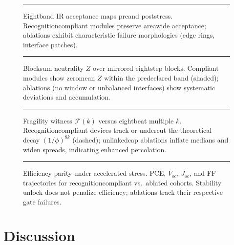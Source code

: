 \documentclass[12pt]{article}
\begin{document}
\begin{figure}[t]
  \centering
  \rule{0.82\linewidth}{0.36\linewidth}
  \caption{Eight\textendash band IR acceptance maps pre\textendash and post\textendash stress. Recognition\textendash compliant modules preserve area\textendash wide acceptance; ablations exhibit characteristic failure morphologies (edge rings, interface patches).}
  \label{fig:acceptance}
\end{figure}

\begin{figure}[t]
  \centering
  \rule{0.82\linewidth}{0.36\linewidth}
  \caption{Block\textendash sum neutrality $Z$ over mirrored eight\textendash step blocks. Compliant modules show zero\textendash mean $Z$ within the predeclared band (shaded); ablations (no window or unbalanced interfaces) show systematic deviations and accumulation.}
  \label{fig:neutrality}
\end{figure}

\begin{figure}[t]
  \centering
  \rule{0.82\linewidth}{0.36\linewidth}
  \caption{Fragility witness $\mathcal{F}(k)$ versus eight\textendash beat multiple $k$. Recognition\textendash compliant devices track or undercut the theoretical decay $(1/\phi)^{8k}$ (dashed); unlinked\textendash cap ablations inflate medians and widen spreads, indicating enhanced percolation.}
  \label{fig:fragility}
\end{figure}

\begin{figure}[t]
  \centering
  \rule{0.82\linewidth}{0.36\linewidth}
  \caption{Efficiency parity under accelerated stress. PCE, $V_{\!oc}$, $J_{\!sc}$, and FF trajectories for recognition\textendash compliant vs.\ ablated cohorts. Stability unlock does not penalize efficiency; ablations track their respective gate failures.}
  \label{fig:pce}
\end{figure}

\section{Discussion}
\end{document}
